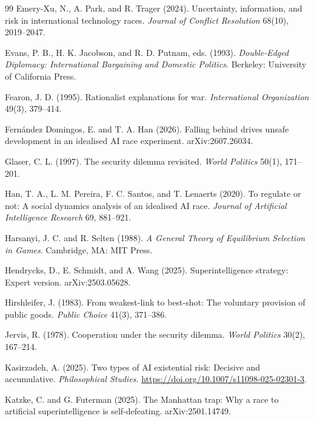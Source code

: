 \documentclass[11pt]{article}
\theoremstyle{plain}
\theoremstyle{definition}
\theoremstyle{remark}
\begin{document}
\begin{thebibliography}{99}
 Emery-Xu, N., A. Park, and R. Trager (2024). Uncertainty, information, and risk in international technology races. \emph{Journal of Conflict Resolution} 68(10), 2019--2047.

 Evans, P. B., H. K. Jacobson, and R. D. Putnam, eds. (1993). \emph{Double-Edged Diplomacy: International Bargaining and Domestic Politics}. Berkeley: University of California Press.

 Fearon, J. D. (1995). Rationalist explanations for war. \emph{International Organization} 49(3), 379--414.

 Fern\'andez Domingos, E. and T. A. Han (2026). Falling behind drives unsafe development in an idealised AI race experiment. arXiv:2607.26034.

 Glaser, C. L. (1997). The security dilemma revisited. \emph{World Politics} 50(1), 171--201.

 Han, T. A., L. M. Pereira, F. C. Santos, and T. Lenaerts (2020). To regulate or not: A social dynamics analysis of an idealised AI race. \emph{Journal of Artificial Intelligence Research} 69, 881--921.

 Harsanyi, J. C. and R. Selten (1988). \emph{A General Theory of Equilibrium Selection in Games}. Cambridge, MA: MIT Press.

 Hendrycks, D., E. Schmidt, and A. Wang (2025). Superintelligence strategy: Expert version. arXiv:2503.05628.

 Hirshleifer, J. (1983). From weakest-link to best-shot: The voluntary provision of public goods. \emph{Public Choice} 41(3), 371--386.

 Jervis, R. (1978). Cooperation under the security dilemma. \emph{World Politics} 30(2), 167--214.

 Kasirzadeh, A. (2025). Two types of AI existential risk: Decisive and accumulative. \emph{Philosophical Studies}. \url{https://doi.org/10.1007/s11098-025-02301-3}.

 Katzke, C. and G. Futerman (2025). The Manhattan trap: Why a race to artificial superintelligence is self-defeating. arXiv:2501.14749.


\end{thebibliography}
\end{document}
